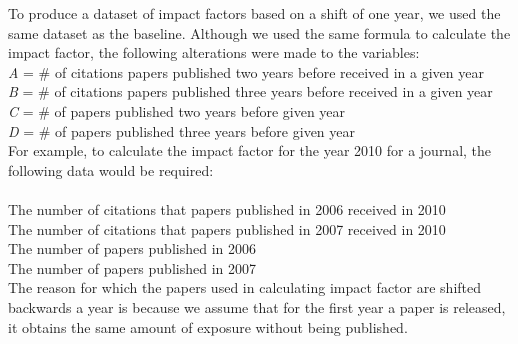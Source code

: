 \documentclass[times]{jtitauth}
\begin{document}
To produce a dataset of impact factors based on a shift of one year, we used the same dataset as the baseline. Although we used the same formula to calculate the impact factor, the following alterations were made to the variables: \\


\textit{A} = \# of citations papers published two years before received in a given year
\\ \textit{B} = \# of citations papers published three years before received in a given year
\\ \textit{C} = \# of papers published two years before given year 
\\ \textit{D} = \# of papers published three years before given year \\

For example, to calculate the impact factor for the year 2010 for a journal, the following data would be required:\\ \\ 
The number of citations that papers published in 2006 received in 2010 
\\The number of citations that papers published in 2007 received in 2010 
\\The number of papers published in 2006
\\The number of papers published in 2007 \\

The reason for which the papers used in calculating impact factor are shifted backwards a year is because we assume that for the first year a paper is released, it obtains the same amount of exposure without being published. 
\end{document}
